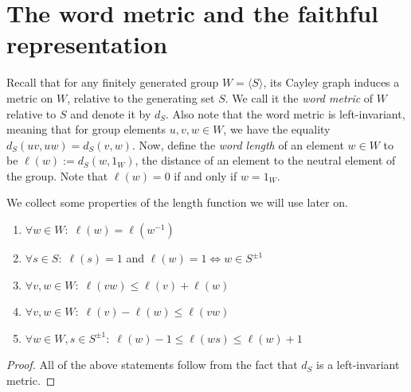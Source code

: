 \section{The word metric and the faithful representation}

Recall that for any finitely generated group \(W = \langle S \rangle\), its Cayley graph induces a metric on \(W\), relative to the generating set \(S\).
We call it the \emph{word metric} of \(W\) relative to \(S\) and denote it by \(d_S\).
Also note that the word metric is left-invariant, meaning that for group elements \(u,v,w\in W\), we have the equality \(d_S(uv,uw) = d_S(v,w)\).
Now, define the \emph{word length} of an element \(w\in W\) to be \(\ell(w) := d_S(w, 1_W)\), the distance of an element to the neutral element of the group.
Note that \(\ell(w) = 0\) if and only if \(w = 1_W\).

\begin{lemma}
    We collect some properties of the length function we will use later on.
    \begin{enumerate}
        \item \(\forall w\in W:\; \ell(w) = \ell(w^{-1})\)
        \item \(\forall s\in S:\; \ell(s) = 1\) and \(\ell(w) = 1 \iff w\in S^{\pm 1}\)
        \item \(\forall v,w\in W:\; \ell(vw)\leq\ell(v)+\ell(w)\)
        \item \(\forall v,w\in W:\; \ell(v)-\ell(w)\leq\ell(vw)\)
        \item \(\forall w\in W, s\in S^{\pm 1}:\; \ell(w)-1\leq\ell(ws)\leq\ell(w)+1\)
    \end{enumerate}
\end{lemma}
\begin{proof}
    All of the above statements follow from the fact that \(d_S\) is a left-invariant metric.
\end{proof}

